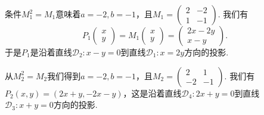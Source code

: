 \begin{solution}
  \begin{inparaenum}[(a)]
    \item 条件$M_1^2=M_1$意味着$a=-2,b=-1$，且$M_1=\begin{pmatrix}
          2 & -2 \\
          1 & -1
        \end{pmatrix}$. 我们有
        \[
          P_1\begin{pmatrix}
            x \\
            y
          \end{pmatrix} = M_1
          \begin{pmatrix}
            x \\
            y
          \end{pmatrix} =
          \begin{pmatrix}
            2x - 2y \\
            x - y
          \end{pmatrix}.
        \]
        于是$P_1$是沿着直线$\mathscr D_2:x-y=0$到直线$\mathscr D_1:x=2y$方向的投影.

    \item 从$M_2^2=M_2$我们得到$a=-2,b=-1$，且$M_2=\begin{pmatrix}
          2 & 1 \\
          -2 & -1
        \end{pmatrix}$. 我们有$P_2(x,y)=(2x+y,-2x-y)$，这是沿着直线$\mathscr D_4:2x+y=0$到直线$\mathscr D_3:x+y=0$方向的投影.
  \end{inparaenum}
\end{solution}

